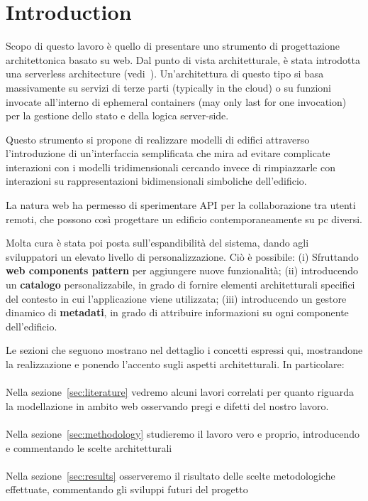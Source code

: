 \section{Introduction}

Scopo di questo lavoro \`e quello di presentare uno strumento di progettazione architettonica basato su web. Dal punto di vista architetturale, \`e stata introdotta una serverless architecture (vedi~\cite{Roberts}). Un'architettura di questo tipo si basa massivamente su servizi di terze parti (typically in the cloud) o su funzioni invocate all'interno di ephemeral containers (may only last for one invocation) per la gestione dello stato e della logica server-side.

Questo strumento si propone di realizzare modelli di edifici attraverso l'introduzione di un'interfaccia semplificata che mira ad evitare complicate interazioni con i modelli tridimensionali cercando invece di rimpiazzarle con interazioni su rappresentazioni bidimensionali simboliche dell'edificio.

La natura web ha permesso di sperimentare API per la collaborazione tra utenti remoti, che possono cos\`i progettare un edificio contemporaneamente su pc diversi.

Molta cura \`e stata poi posta sull'espandibilit\`a del sistema, dando agli sviluppatori un elevato livello di personalizzazione. Ci\`o \`e possibile: (i) Sfruttando \textbf{web components pattern} per aggiungere nuove funzionalità; (ii) introducendo un \textbf{catalogo} personalizzabile, in grado di fornire elementi architetturali specifici del contesto in cui l'applicazione viene utilizzata; (iii) introducendo un gestore dinamico di \textbf{metadati}, in grado di 
attribuire informazioni su ogni componente dell'edificio.

Le sezioni che seguono mostrano nel dettaglio i concetti espressi qui, mostrandone la realizzazione e ponendo l'accento sugli aspetti architetturali. In particolare:\\\\
Nella sezione~\ref{sec:literature} vedremo alcuni lavori correlati per quanto riguarda la modellazione in ambito web osservando pregi e difetti del nostro lavoro.\\\\
Nella sezione~\ref{sec:methodology} studieremo il lavoro vero e proprio, introducendo e commentando le scelte architetturali\\\\
Nella sezione~\ref{sec:results} osserveremo il risultato delle scelte metodologiche effettuate, commentando gli sviluppi futuri del progetto\\\\